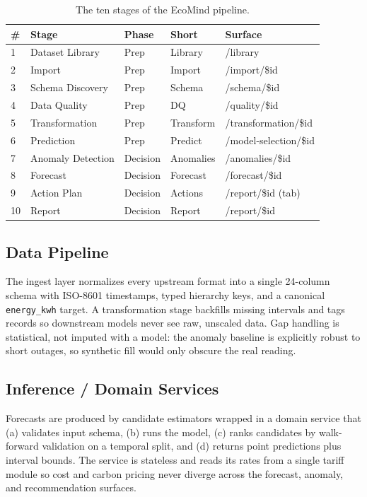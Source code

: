 \documentclass[conference, 10pt, a4paper]{IEEEtran}
\begin{document}
\begin{table}[h!]
\caption{The ten stages of the EcoMind pipeline.}
\centering
\begin{tabular}{@{}lllll@{}}
\toprule
\# & Stage & Phase & Short & Surface \\
\midrule
1  & Dataset Library& Prep & Library & /library \\
2  & Import         & Prep & Import  & /import/\$id \\
3  & Schema Discovery & Prep & Schema  & /schema/\$id \\
4  & Data Quality   & Prep & DQ      & /quality/\$id \\
5  & Transformation & Prep & Transform & /transformation/\$id \\
6  & Prediction     & Prep & Predict & /model-selection/\$id \\
7  & Anomaly Detection & Decision & Anomalies & /anomalies/\$id \\
8  & Forecast       & Decision & Forecast & /forecast/\$id \\
9  & Action Plan    & Decision & Actions & /report/\$id (tab) \\
10 & Report         & Decision & Report & /report/\$id \\
\bottomrule
\end{tabular}
\label{tab:stages}
\end{table}

\subsection{Data Pipeline}
The ingest layer normalizes every upstream format into a single 24-column
schema with ISO-8601 timestamps, typed hierarchy keys, and a canonical
\texttt{energy\_kwh} target. A transformation stage backfills missing intervals
and tags records so downstream models never see raw, unscaled data. Gap
handling is statistical, not imputed with a model: the anomaly baseline is
explicitly robust to short outages, so synthetic fill would only obscure the
real reading.

\subsection{Inference / Domain Services}
Forecasts are produced by candidate estimators wrapped in a domain service
that (a) validates input schema, (b) runs the model, (c) ranks candidates by
walk-forward validation on a temporal split, and (d) returns point predictions
plus interval bounds. The service is stateless and reads its rates from a
single tariff module \cite{liu2018statistical} so cost and carbon pricing never
diverge across the forecast, anomaly, and recommendation surfaces.
\end{document}
